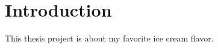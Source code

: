 \pagestyle{plain}

\chapter*{Introduction}
This thesis project is about my favorite ice cream flavor. \todo